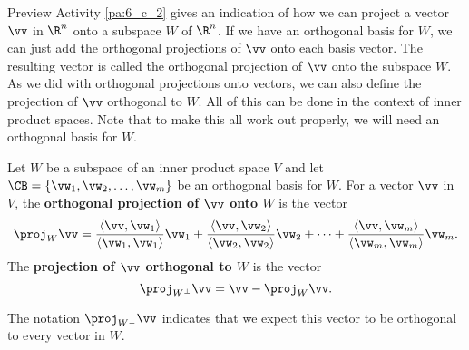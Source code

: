 Preview Activity \ref{pa:6_c_2} gives an indication of how we can project a vector $\vv$ in $\R^n$ onto a subspace $W$ of $\R^n$. If we have an orthogonal basis for $W$, we can just add the orthogonal projections of $\vv$ onto each basis vector. The resulting vector is called the orthogonal projection of $\vv$ onto the subspace $W$. As we did with orthogonal projections onto vectors, we can also define the projection of $\vv$ orthogonal to $W$. All of this can be done in the context of inner product spaces. Note that to make this all work out properly, we will need an orthogonal basis for $W$. 

\begin{definition} Let $W$ be a subspace of an inner product space $V$ and let $\CB = \{\vw_1, \vw_2, \ldots, \vw_m\}$ be an orthogonal basis for $W$. For a vector $\vv$ in $V$, the \textbf{orthogonal projection of $\vv$ onto $W$} is the vector
\[\proj_W \vv =  \frac{\langle \vv, \vw_1 \rangle }{\langle \vw_1, \vw_1 \rangle } \vw_1 + \frac{\langle \vv, \vw_2 \rangle }{\langle \vw_2, \vw_2 \rangle }  \vw_2 + \cdots + \frac{\langle \vv, \vw_m \rangle}{\langle \vw_m, \vw_m \rangle} \vw_m.\] 
The \textbf{projection of $\vv$ orthogonal to $W$} is the vector
\[\proj_{W^{\perp}} \vv = \vv - \proj_W \vv.\]
\end{definition}


The notation $\proj_{W^{\perp}} \vv$ indicates that we expect this vector to be orthogonal to every vector in $W$. 

